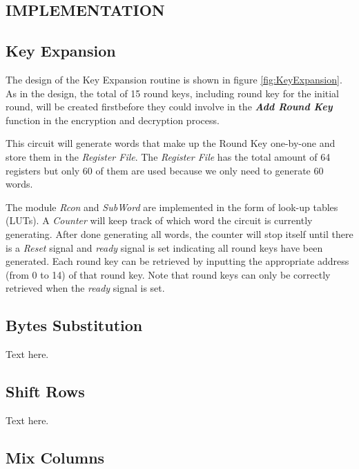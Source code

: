 \documentclass[a4paper, 10pt]{article}
\begin{document}
        \begin{multicols}{2}
        \section{IMPLEMENTATION}

            \subsection{Key Expansion}

            The design of the Key Expansion routine is shown in figure \ref{fig:KeyExpansion}. As in the design, the total of 15 round keys, including round key for the initial round, will be created firstbefore they could involve in the \textbf{\textit{Add Round Key}} function in the encryption and decryption process.
            
            This circuit will generate words that make up the Round Key one-by-one and store them in the \textit{Register File}. The \textit{Register File} has the total amount of 64 registers but only 60 of them are used because we only need to generate 60 words.

            The module \textit{Rcon} and \textit{SubWord} are implemented in the form of look-up tables (LUTs). A \textit{Counter} will keep track of which word the circuit is currently generating. After done generating all words, the counter will stop itself until there is a \textit{Reset} signal and \textit{ready} signal is set indicating all round keys have been generated. Each round key can be retrieved by inputting the appropriate address (from 0 to 14) of that round key. Note that round keys can only be correctly retrieved when the \textit{ready} signal is set.

            \subsection{Bytes Substitution}

            Text here.

            \subsection{Shift Rows}

            Text here.

            \subsection{Mix Columns}


\end{multicols}
\end{document}
